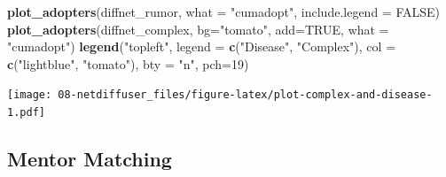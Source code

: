 \documentclass[]{book}
\newenvironment{Shaded}{\begin{snugshade}}{\end{snugshade}}
\newcommand{\CommentTok}[1]{\textcolor[rgb]{0.56,0.35,0.01}{\textit{#1}}}
\newcommand{\DataTypeTok}[1]{\textcolor[rgb]{0.13,0.29,0.53}{#1}}
\newcommand{\DecValTok}[1]{\textcolor[rgb]{0.00,0.00,0.81}{#1}}
\newcommand{\KeywordTok}[1]{\textcolor[rgb]{0.13,0.29,0.53}{\textbf{#1}}}
\newcommand{\NormalTok}[1]{#1}
\newcommand{\OperatorTok}[1]{\textcolor[rgb]{0.81,0.36,0.00}{\textbf{#1}}}
\newcommand{\OtherTok}[1]{\textcolor[rgb]{0.56,0.35,0.01}{#1}}
\newcommand{\StringTok}[1]{\textcolor[rgb]{0.31,0.60,0.02}{#1}}
\begin{document}
\begin{Shaded}
\begin{Highlighting}[]
\KeywordTok{plot_adopters}\NormalTok{(diffnet_rumor, }\DataTypeTok{what =} \StringTok{"cumadopt"}\NormalTok{, }\DataTypeTok{include.legend =} \OtherTok{FALSE}\NormalTok{)}
\KeywordTok{plot_adopters}\NormalTok{(diffnet_complex, }\DataTypeTok{bg=}\StringTok{"tomato"}\NormalTok{, }\DataTypeTok{add=}\OtherTok{TRUE}\NormalTok{, }\DataTypeTok{what =} \StringTok{"cumadopt"}\NormalTok{)}
\KeywordTok{legend}\NormalTok{(}\StringTok{"topleft"}\NormalTok{, }\DataTypeTok{legend =} \KeywordTok{c}\NormalTok{(}\StringTok{"Disease"}\NormalTok{, }\StringTok{"Complex"}\NormalTok{), }\DataTypeTok{col =} \KeywordTok{c}\NormalTok{(}\StringTok{"lightblue"}\NormalTok{, }\StringTok{"tomato"}\NormalTok{),}
       \DataTypeTok{bty =} \StringTok{"n"}\NormalTok{, }\DataTypeTok{pch=}\DecValTok{19}\NormalTok{)}
\end{Highlighting}
\end{Shaded}

\texttt{[image: 08-netdiffuser\_files/figure-latex/plot-complex-and-disease-1.pdf]}

\hypertarget{mentor-matching}{%
\subsection{Mentor Matching}\label{mentor-matching}}

\begin{Shaded}
\end{Shaded}
\end{document}

